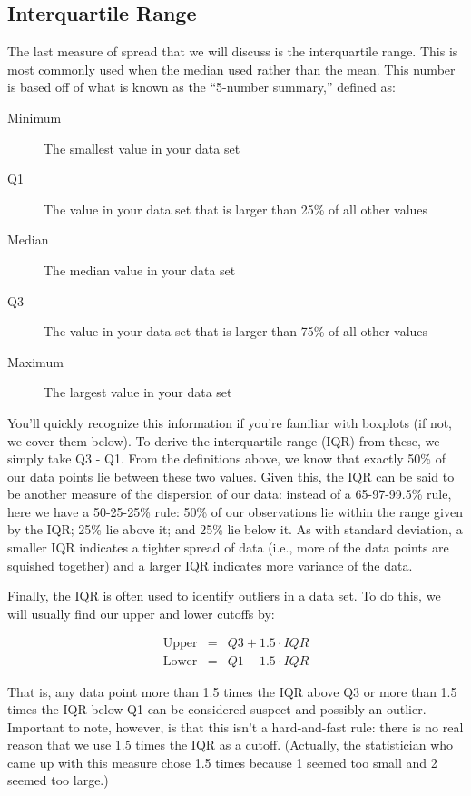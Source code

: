 \subsection{Interquartile Range}
The last measure of spread that we will discuss is the interquartile range. This is most commonly used when the median used rather than the mean. This number is based off of what is known as the ``5-number summary,'' defined as:

\begin{description}
\item[Minimum]{The smallest value in your data set}
\item[Q1]{The value in your data set that is larger than 25\% of all other values}
\item[Median]{The median value in your data set}
\item[Q3]{The value in your data set that is larger than 75\% of all other values}
\item[Maximum]{The largest value in your data set}
\end{description}

You'll quickly recognize this information if you're familiar with boxplots (if not, we cover them below). To derive the interquartile range (IQR) from these, we simply take Q3 - Q1. From the definitions above, we know that exactly 50\% of our data points lie between these two values. Given this, the IQR can be said to be another measure of the dispersion of our data: instead of a 65-97-99.5\% rule, here we have a 50-25-25\% rule: 50\% of our observations lie within the range given by the IQR; 25\% lie above it; and 25\% lie below it. As with standard deviation, a smaller IQR indicates a tighter spread of data (i.e., more of the data points are squished together) and a larger IQR indicates more variance of the data.

Finally, the IQR is often used to identify outliers in a data set. To do this, we will usually find our upper and lower cutoffs by:

\begin{eqnarray*}
    \text{Upper} &=& Q3+1.5\cdot IQR \\
    \text{Lower} &=& Q1-1.5\cdot IQR
\end{eqnarray*}

That is, any data point more than 1.5 times the IQR above Q3 or more than 1.5 times the IQR below Q1 can be considered suspect and possibly an outlier. Important to note, however, is that this isn't a hard-and-fast rule: there is no real reason that we use 1.5 times the IQR as a cutoff. (Actually, the statistician who came up with this measure chose 1.5 times because 1 seemed too small and 2 seemed too large.)

